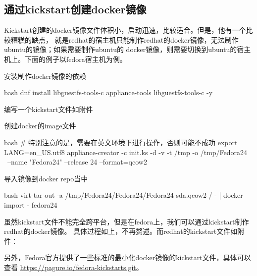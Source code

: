 \subsection{通过kickstart创建docker镜像}
Kickstart创建的docker镜像文件体积小，启动迅速，比较适合。但是，他有一个比较糟糕的缺点，
就是redhat的宿主机只能制作redhat的docker镜像，无法制作ubuntu的镜像；如果需要制作ubuntu的
docker镜像，则需要切换到ubuntu的宿主机上。下面的例子以fedora宿主机为例。
\begin{outline}[enumerate]
  \1 安装制作docker镜像的依赖
\begin{code-in-enumerate}{bash}
dnf install libguestfs-tools-c appliance-tools libguestfs-tools-c -y
\end{code-in-enumerate}

  \1 编写一个kickstart文件如附件

  \1 创建docker的image文件
\begin{code-in-enumerate}{bash}
# 特别注意的是，需要在英文环境下进行操作，否则可能不成功
export LANG=en_US.utf8
appliance-creator -c init.ks -d -v -t /tmp -o /tmp/Fedora24 \
      --name "Fedora24" --release 24 --format=qcow2
\end{code-in-enumerate}

  \1 导入镜像到docker repo当中
\begin{code-in-enumerate}{bash}
virt-tar-out -a /tmp/Fedora24/Fedora24/Fedora24-sda.qcow2 / - | docker import - fedora24
\end{code-in-enumerate}
\end{outline}

虽然kickstart文件不能完全跨平台，但是在fedora上，我们可以通过kickstart制作redhat的docker镜像。
具体过程如上，不再赘述。而redhat的kickstart文件如附件：

另外，Fedora官方提供了一些标准的最小化docker镜像的kickstart文件，具体可以查看
\url{https://pagure.io/fedora-kickstarts.git}。

